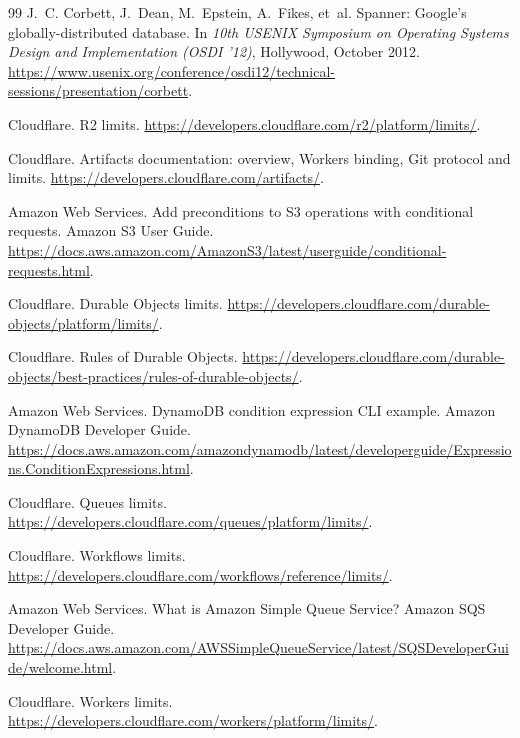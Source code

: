 \documentclass[11pt,letterpaper]{article}
\theoremstyle{definition}
\theoremstyle{remark}
\begin{document}
\begin{thebibliography}{99}
J.~C. Corbett, J.~Dean, M.~Epstein, A.~Fikes, et~al.
\newblock Spanner: {Google's} globally-distributed database.
\newblock In \emph{10th USENIX Symposium on Operating Systems Design and Implementation (OSDI '12)}, Hollywood, October 2012.
\newblock \url{https://www.usenix.org/conference/osdi12/technical-sessions/presentation/corbett}.

Cloudflare.
\newblock R2 limits.
\newblock \url{https://developers.cloudflare.com/r2/platform/limits/}.

Cloudflare.
\newblock Artifacts documentation: overview, Workers binding, Git protocol and limits.
\newblock \url{https://developers.cloudflare.com/artifacts/}.

Amazon Web Services.
\newblock Add preconditions to S3 operations with conditional requests.
\newblock Amazon S3 User Guide.
\newblock \url{https://docs.aws.amazon.com/AmazonS3/latest/userguide/conditional-requests.html}.

Cloudflare.
\newblock Durable Objects limits.
\newblock \url{https://developers.cloudflare.com/durable-objects/platform/limits/}.

Cloudflare.
\newblock Rules of Durable Objects.
\newblock \url{https://developers.cloudflare.com/durable-objects/best-practices/rules-of-durable-objects/}.

Amazon Web Services.
\newblock DynamoDB condition expression CLI example.
\newblock Amazon DynamoDB Developer Guide.
\newblock \url{https://docs.aws.amazon.com/amazondynamodb/latest/developerguide/Expressions.ConditionExpressions.html}.

Cloudflare.
\newblock Queues limits.
\newblock \url{https://developers.cloudflare.com/queues/platform/limits/}.

Cloudflare.
\newblock Workflows limits.
\newblock \url{https://developers.cloudflare.com/workflows/reference/limits/}.

Amazon Web Services.
\newblock What is Amazon Simple Queue Service?
\newblock Amazon SQS Developer Guide.
\newblock \url{https://docs.aws.amazon.com/AWSSimpleQueueService/latest/SQSDeveloperGuide/welcome.html}.

Cloudflare.
\newblock Workers limits.
\newblock \url{https://developers.cloudflare.com/workers/platform/limits/}.


\end{thebibliography}
\end{document}
